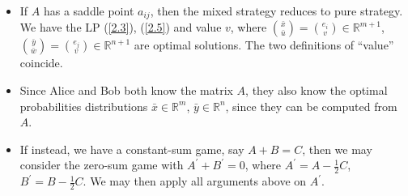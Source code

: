 \begin{remark}
    \begin{itemize}
        \item If $A$ has a saddle point $a_{ij}$, then the mixed strategy reduces to pure strategy. We have the LP (\ref{2.3}), (\ref{2.5}) and value $v$, where $\binom{\bar{x}}{\bar{u}} = \binom{e_i}{v}\in\mathbb{R}^{m+1}$, $\binom{\bar{y}}{\bar{w}} = \binom{e_j}{v} \in\mathbb{R}^{n+1}$ are optimal solutions. The two definitions of ``value'' coincide.
        \item Since Alice and Bob both know the matrix $A$, they also know the optimal probabilities distributions $\bar{x}\in\mathbb{R}^m$, $\bar{y}\in\mathbb{R}^n$, since they can be computed from $A$.
        \item If instead, we have a constant-sum game, say $A+B=C$, then we may consider the zero-sum game with $A^{\prime}+B^{\prime} = 0$, where $A^{\prime} = A - \frac{1}{2}C$, $B^{\prime} = B - \frac{1}{2}C$. We may then apply all arguments above on $A^{\prime}$.
    \end{itemize}
\end{remark}

